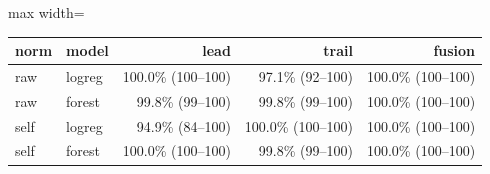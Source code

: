 \begin{adjustbox}{max width=\textwidth}
{\footnotesize
\begin{tabular}{llrrr}
\toprule
\textbf{norm} & \textbf{model} & \textbf{lead} & \textbf{trail} & \textbf{fusion} \\
\midrule
raw & logreg & 100.0\% (100--100) & 97.1\% (92--100) & 100.0\% (100--100) \\
raw & forest & 99.8\% (99--100) & 99.8\% (99--100) & 100.0\% (100--100) \\
self & logreg & 94.9\% (84--100) & 100.0\% (100--100) & 100.0\% (100--100) \\
self & forest & 100.0\% (100--100) & 99.8\% (99--100) & 100.0\% (100--100) \\
\bottomrule
\end{tabular}
}
\end{adjustbox}
